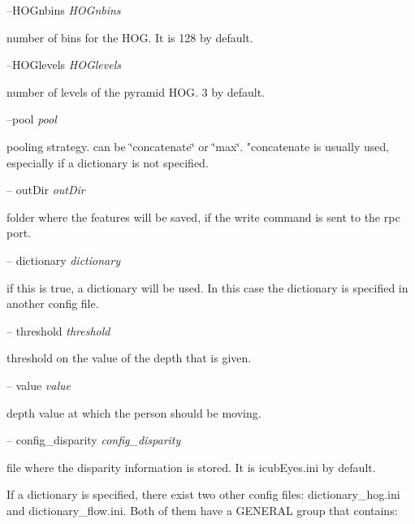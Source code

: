 --H\+O\+Gnbins {\itshape H\+O\+Gnbins} 
\begin{DoxyItemize}
\item number of bins for the H\+OG. It is 128 by default.
\end{DoxyItemize}

--H\+O\+Glevels {\itshape H\+O\+Glevels} 
\begin{DoxyItemize}
\item number of levels of the pyramid H\+OG. 3 by default.
\end{DoxyItemize}

--pool {\itshape pool} 
\begin{DoxyItemize}
\item pooling strategy. can be \char`\"{}concatenate\char`\"{} or \char`\"{}max\char`\"{}. "concatenate is usually used, especially if a dictionary is not specified.
\end{DoxyItemize}

-- out\+Dir {\itshape out\+Dir} 
\begin{DoxyItemize}
\item folder where the features will be saved, if the write command is sent to the rpc port.
\end{DoxyItemize}

-- dictionary {\itshape dictionary} 
\begin{DoxyItemize}
\item if this is true, a dictionary will be used. In this case the dictionary is specified in another config file.
\end{DoxyItemize}

-- threshold {\itshape threshold} 
\begin{DoxyItemize}
\item threshold on the value of the depth that is given.
\end{DoxyItemize}

-- value {\itshape value} 
\begin{DoxyItemize}
\item depth value at which the person should be moving.
\end{DoxyItemize}

-- config\+\_\+disparity {\itshape config\+\_\+disparity} 
\begin{DoxyItemize}
\item file where the disparity information is stored. It is icub\+Eyes.\+ini by default.
\end{DoxyItemize}

If a dictionary is specified, there exist two other config files\+: dictionary\+\_\+hog.\+ini and dictionary\+\_\+flow.\+ini. Both of them have a G\+E\+N\+E\+R\+AL group that contains\+:

